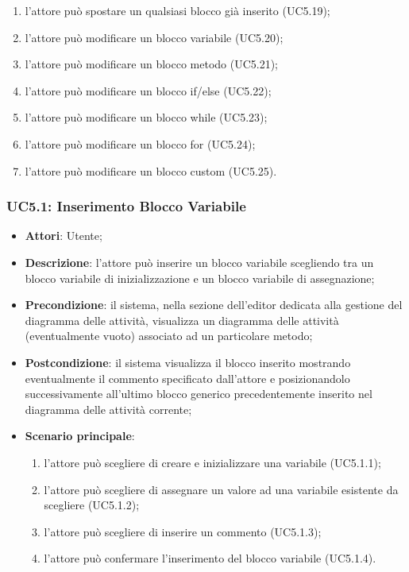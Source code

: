 \begin{itemize}
\begin{enumerate}
\item l'attore può spostare un qualsiasi blocco già inserito (UC5.19);
\item l'attore può modificare un blocco variabile (UC5.20);
\item l'attore può modificare un blocco metodo (UC5.21);
\item l'attore può modificare un blocco if/else (UC5.22);
\item l'attore può modificare un blocco while (UC5.23);
\item l'attore può modificare un blocco for (UC5.24);
\item l'attore può modificare un blocco custom (UC5.25).
\end{enumerate}
\end{itemize}

\subsubsection{UC5.1: Inserimento Blocco Variabile}
\label{UC5.1}
\begin{itemize}
\item \textbf{Attori}: Utente;
\item \textbf{Descrizione}: l'attore può inserire un blocco variabile scegliendo tra un blocco variabile di inizializzazione e un blocco variabile di assegnazione;
\item \textbf{Precondizione}: il sistema, nella sezione dell'editor dedicata alla gestione del diagramma delle attività, visualizza un diagramma delle attività (eventualmente vuoto) associato ad un particolare metodo;
\item \textbf{Postcondizione}: il sistema visualizza il blocco inserito mostrando eventualmente il commento specificato dall'attore e posizionandolo successivamente all'ultimo blocco generico precedentemente inserito nel diagramma delle attività corrente;
\item \textbf{Scenario principale}:
\begin{enumerate}
\item l'attore può scegliere di creare e inizializzare una variabile (UC5.1.1);
\item l'attore può scegliere di assegnare un valore ad una variabile esistente da scegliere (UC5.1.2);
\item l'attore può scegliere di inserire un commento (UC5.1.3);
\item l'attore può confermare l'inserimento del blocco variabile (UC5.1.4).
\end{enumerate}
\end{itemize}


